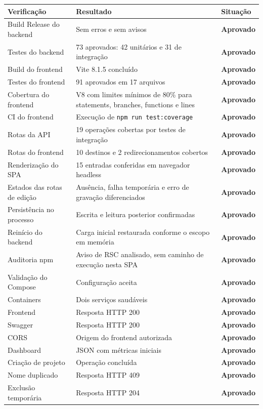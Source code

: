 \documentclass[12pt,a4paper,openany]{report}
\newcommand{\statusok}{\textcolor{OrbitGreen}{\textbf{Aprovado}}}
\begin{document}
\begin{longtable}{p{} p{} p{}}
\toprule
Verificação & Resultado & Situação \\
\midrule
\endhead
Build Release do backend & Sem erros e sem avisos & \statusok \\
Testes do backend & 73 aprovados: 42 unitários e 31 de integração & \statusok \\
Build do frontend & Vite 8.1.5 concluído & \statusok \\
Testes do frontend & 91 aprovados em 17 arquivos & \statusok \\
Cobertura do frontend & V8 com limites mínimos de 80\% para statements, branches, functions e lines & \statusok \\
CI do frontend & Execução de \texttt{npm run test:coverage} & \statusok \\
Rotas da API & 19 operações cobertas por testes de integração & \statusok \\
Rotas do frontend & 10 destinos e 2 redirecionamentos cobertos & \statusok \\
Renderização do SPA & 15 entradas conferidas em navegador headless & \statusok \\
Estados das rotas de edição & Ausência, falha temporária e erro de gravação diferenciados & \statusok \\
Persistência no processo & Escrita e leitura posterior confirmadas & \statusok \\
Reinício do backend & Carga inicial restaurada conforme o escopo em memória & \statusok \\
Auditoria npm & Aviso de RSC analisado, sem caminho de execução nesta SPA & \statusok \\
Validação do Compose & Configuração aceita & \statusok \\
Containers & Dois serviços saudáveis & \statusok \\
Frontend & Resposta HTTP 200 & \statusok \\
Swagger & Resposta HTTP 200 & \statusok \\
CORS & Origem do frontend autorizada & \statusok \\
Dashboard & JSON com métricas iniciais & \statusok \\
Criação de projeto & Operação concluída & \statusok \\
Nome duplicado & Resposta HTTP 409 & \statusok \\
Exclusão temporária & Resposta HTTP 204 & \statusok \\
\bottomrule
\end{longtable}
\end{document}
